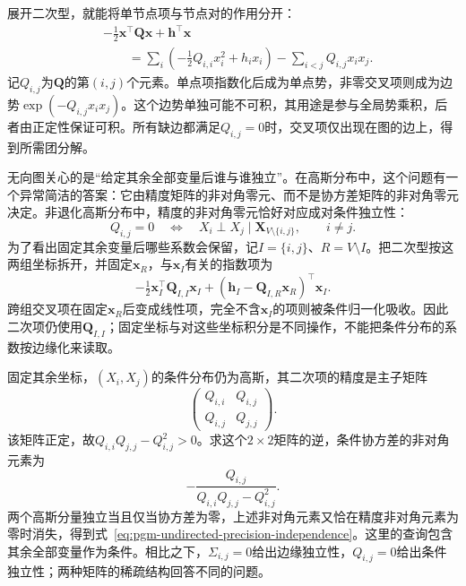 展开二次型，就能将单节点项与节点对的作用分开：
\[
  \begin{aligned}
    &-\tfrac12\bm{x}^{\top}\bm{Q}\bm{x}+\bm{h}^{\top}\bm{x}\\
    &\qquad=\sum_i\left(-\tfrac12 Q_{i,i}x_i^2+h_i x_i\right)
             -\sum_{i<j}Q_{i,j}x_i x_j.
  \end{aligned}
\]
记$Q_{i,j}$为$\bm{Q}$的第$(i,j)$个元素。单点项指数化后成为单点势，非零交叉项则成为边势$\exp(-Q_{i,j}x_i x_j)$。这个边势单独可能不可积，其用途是参与全局势乘积，后者由正定性保证可积。所有缺边都满足$Q_{i,j}=0$时，交叉项仅出现在图的边上，得到所需团分解。

无向图关心的是“给定其余全部变量后谁与谁独立”。在高斯分布中，这个问题有一个异常简洁的答案：它由精度矩阵的非对角零元、而不是协方差矩阵的非对角零元决定。非退化高斯分布中，精度的非对角零元恰好对应成对条件独立性：
\begin{equation}
  Q_{i,j}=0
  \quad\Longleftrightarrow\quad
  X_i\perp X_j\mid\bm{X}_{V\setminus\{i,j\}},
  \qquad i\neq j.
  \label{eq:pgm-undirected-precision-independence}
\end{equation}
为了看出固定其余变量后哪些系数会保留，记$I=\{i,j\}$、$R=V\setminus I$。把二次型按这两组坐标拆开，并固定$\bm{x}_R$，与$\bm{x}_I$有关的指数项为
\[
  -\tfrac12\bm{x}_I^{\top}\bm{Q}_{I,I}\bm{x}_I
  +(\bm{h}_I-\bm{Q}_{I,R}\bm{x}_R)^{\top}\bm{x}_I.
\]
跨组交叉项在固定$\bm{x}_R$后变成线性项，完全不含$\bm{x}_I$的项则被条件归一化吸收。因此二次项仍使用$\bm{Q}_{I,I}$；固定坐标与对这些坐标积分是不同操作，不能把条件分布的系数按边缘化来读取。

固定其余坐标，$(X_i,X_j)$的条件分布仍为高斯，其二次项的精度是主子矩阵
\[
  \begin{pmatrix}Q_{i,i}&Q_{i,j}\\Q_{i,j}&Q_{j,j}\end{pmatrix}.
\]
该矩阵正定，故$Q_{i,i}Q_{j,j}-Q_{i,j}^2>0$。求这个$2\times2$矩阵的逆，条件协方差的非对角元素为
\[
  -\frac{Q_{i,j}}{Q_{i,i}Q_{j,j}-Q_{i,j}^2}.
\]
两个高斯分量独立当且仅当协方差为零，上述非对角元素又恰在精度非对角元素为零时消失，得到式~\eqref{eq:pgm-undirected-precision-independence}。这里的查询包含其余全部变量作为条件。相比之下，$\Sigma_{i,j}=0$给出边缘独立性，$Q_{i,j}=0$给出条件独立性；两种矩阵的稀疏结构回答不同的问题。

